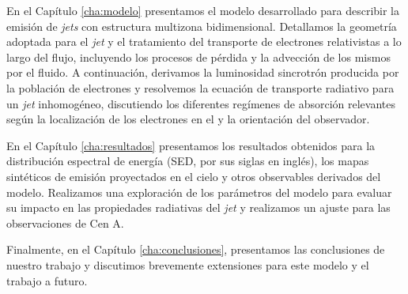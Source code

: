 	En el Capítulo \ref{cha:modelo} presentamos el modelo desarrollado para describir la emisión de \textit{jets} con estructura multizona bidimensional.
	Detallamos la geometría adoptada para el \textit{jet} y el tratamiento del transporte de electrones relativistas a lo largo del flujo, incluyendo los procesos de pérdida y la advección de los mismos por el fluido.
	A continuación, derivamos la luminosidad sincrotrón producida por la población de electrones y resolvemos la ecuación de transporte radiativo para un \textit{jet} inhomogéneo, discutiendo los diferentes regímenes de absorción relevantes según la localización de los electrones en el \jet y la orientación del observador.

	En el Capítulo \ref{cha:resultados} presentamos los resultados obtenidos para la distribución espectral de energía (SED, por sus siglas en inglés), los mapas sintéticos de emisión proyectados en el cielo y otros observables derivados del modelo.
	Realizamos una exploración de los parámetros del modelo para evaluar su impacto en las propiedades radiativas del \textit{jet} y realizamos un ajuste para las observaciones de Cen A.

	Finalmente, en el Capítulo \ref{cha:conclusiones}, presentamos las conclusiones de nuestro trabajo y discutimos brevemente extensiones para este modelo y el trabajo a futuro.

